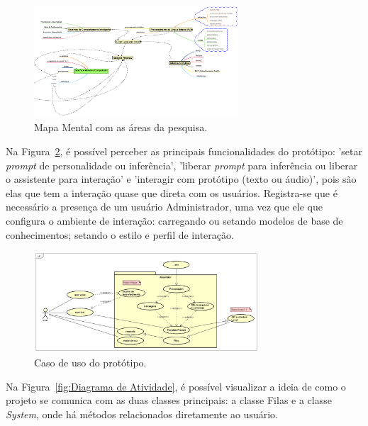 \documentclass[10pt, conference, compsocconf]{IEEEtran}
\begin{document}
\FloatBarrier

\begin{figure}[!h]
\centering
\includegraphics[width=3.0in]{images/Mapa mental.png}
\caption{Mapa Mental com as áreas da pesquisa.} 
\label{fig:Mapamental}
\end{figure}

\FloatBarrier

Na Figura~\ref{fig:Casodeuso}, é possível perceber as principais funcionalidades do protótipo: 'setar \textit{prompt} de personalidade ou inferência', 'liberar \textit{prompt} para inferência ou liberar o assistente para interação' e 'interagir com protótipo (texto ou áudio)', pois são elas que tem a interação quase que direta com os usuários. Registra-se que é necessário a presença de um usuário Administrador, uma vez que ele que configura o ambiente de interação: carregando ou setando modelos de base de conhecimentos; setando o estilo e perfil de interação.

\FloatBarrier

\begin{figure}[!h]
\centering
\includegraphics[width=3.3in]{images/UseCase.png}
\caption{Caso de uso do protótipo.} 
\label{fig:Casodeuso}
\end{figure}

\FloatBarrier

Na Figura~\ref{fig:Diagrama de Atividade}, é possível visualizar a ideia de como o projeto se comunica com as duas classes principais: a classe  Filas e a classe \textit{System}, onde há  métodos relacionados diretamente  ao usuário.

\FloatBarrier
\end{document}
